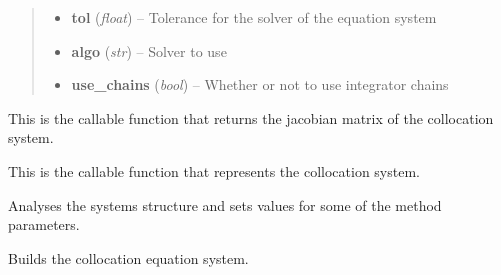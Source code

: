 \documentclass[letterpaper,10pt,english]{sphinxmanual}
\begin{document}
\begin{fulllineitems}
\begin{quote}
\begin{description}
\begin{itemize}
\item {} 
\textbf{tol} (\emph{float}) -- Tolerance for the solver of the equation system

\item {} 
\textbf{algo} (\emph{str}) -- Solver to use

\item {} 
\textbf{use\_chains} (\emph{bool}) -- Whether or not to use integrator chains

\end{itemize}

\end{description}\end{quote}

\begin{fulllineitems}
\label{pytrajectory:pytrajectory.trajectory.Trajectory.DG}
This is the callable function that returns the jacobian matrix of the collocation system.

\end{fulllineitems}


\begin{fulllineitems}
\label{pytrajectory:pytrajectory.trajectory.Trajectory.G}
This is the callable function that represents the collocation system.

\end{fulllineitems}


\begin{fulllineitems}
\label{pytrajectory:pytrajectory.trajectory.Trajectory.analyseSystem}
Analyses the systems structure and sets values for some of the method parameters.

\end{fulllineitems}


\begin{fulllineitems}
\label{pytrajectory:pytrajectory.trajectory.Trajectory.buildEQS}
Builds the collocation equation system.

\end{fulllineitems}


\end{fulllineitems}
\end{document}
